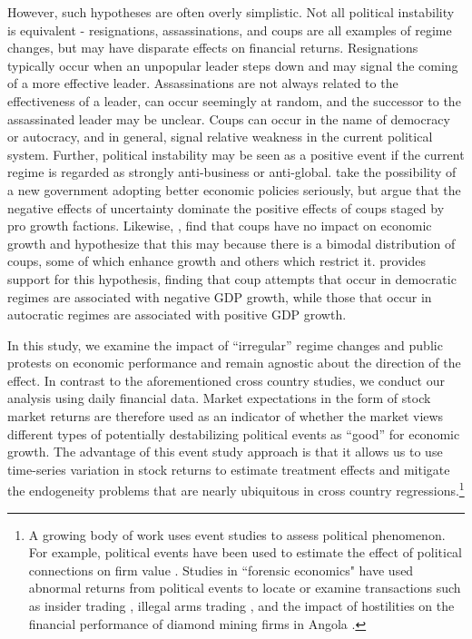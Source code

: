 \documentclass[12pt,final,fleqn]{article}
\theoremstyle{plain}
\begin{document}
However, such hypotheses are often overly simplistic. Not all political instability is equivalent - resignations, assassinations, and coups are all examples of regime changes, but may have disparate effects on financial returns. Resignations typically occur when an unpopular leader steps down and may signal the coming of a more effective leader. Assassinations are not always related to the effectiveness of a leader, can occur seemingly at random, and the successor to the assassinated leader may be unclear. Coups can occur in the name of democracy or autocracy, and in general, signal relative weakness in the current political system. Further, political instability may be seen as a positive event if the current regime is regarded as strongly anti-business or anti-global.  \citet{alesina1996political} take the possibility of a new government adopting better economic policies seriously, but argue that the negative effects of uncertainty dominate the positive effects of coups staged by pro growth factions. Likewise, \citet{londregan1990poverty}, find that coups have no impact on economic growth and hypothesize that this may because there is a bimodal distribution of coups, some of which enhance growth and others which restrict it. \citet{meyersson2016political} provides  support for this hypothesis, finding that coup attempts that occur in democratic regimes are associated with negative GDP growth, while those that occur in autocratic regimes are associated with positive GDP growth.

In this study, we examine the impact of ``irregular'' regime changes and public protests on economic performance and remain agnostic about the direction of the effect. In contrast to the aforementioned cross country studies, we  conduct our analysis using daily financial data. Market expectations in the form of stock market returns are therefore used as an indicator of whether the market views different types of potentially destabilizing political events as ``good'' for economic growth.  The advantage of this event study approach is that it allows us to use time-series variation in stock returns to estimate treatment effects and mitigate the endogeneity problems that are nearly ubiquitous in cross country regressions.\footnote{A growing body of work uses event studies to assess political phenomenon.  For example, political events have been used to estimate the effect of political connections on firm value \citep[e.g.][]{fisman2001estimating,faccio2006politically,goldman2009politically}. Studies in ``forensic economics" have used abnormal returns from political events to locate or examine transactions such as insider trading \citep{dube2011coups}, illegal arms trading \citep{dellavigna2010detecting}, and the impact of hostilities on the financial performance of diamond mining firms in Angola \citep{guidolin2007diamonds}.}
\end{document}
